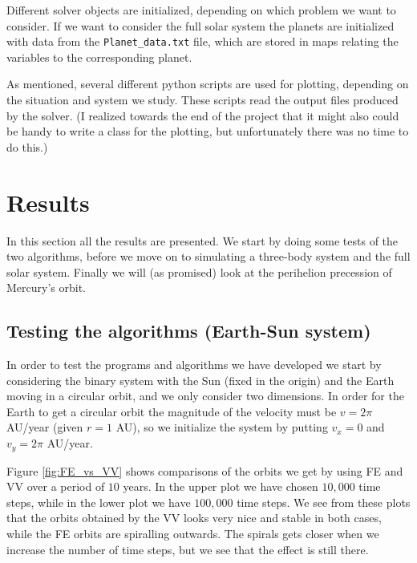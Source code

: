 \documentclass[12pt, a4paper]{article}
\begin{document}
Different solver objects are initialized, depending on which problem we want to consider. If we want to 
consider the full solar system the planets are initialized with data from the \texttt{Planet\_data.txt} 
file, which are stored in maps relating the variables to the corresponding planet.  

As mentioned, several different python scripts are used for plotting, depending on the situation and 
system we study. These scripts read the output files produced by the solver. (I realized towards 
the end of the project that it might also could be handy to write a class for the plotting, 
but unfortunately there was no time to do this.) 

\section{Results}

In this section all the results are presented. We start by doing some tests of the two algorithms, before 
we move on to simulating a three-body system and the full solar system. Finally we will (as promised) 
look at the perihelion precession of Mercury's orbit. 

\subsection{Testing the algorithms (Earth-Sun system)}

In order to test the programs and algorithms we have developed we start by considering the binary system 
with the Sun (fixed in the origin) 
and the Earth moving in a circular orbit, and we only consider two dimensions. In order for the Earth to 
get a circular orbit the magnitude of the velocity must be $v=2\pi$ AU/year (given $r = 1$ AU), so we 
initialize the system by putting $v_x = 0$ and $v_y = 2\pi$ AU/year. 

Figure \ref{fig:FE_vs_VV} shows comparisons of the orbits we get by using FE and VV 
over a period of $10$ years. In the upper plot we have chosen $10,000$ time steps, while in 
the lower plot we have $100,000$ time steps. We see from these plots that the orbits obtained by the 
VV looks very nice and stable in both cases, while the FE orbits are spiralling outwards. The spirals 
gets closer when we increase the number of time steps, but we see that the effect is still there. 
\end{document}

